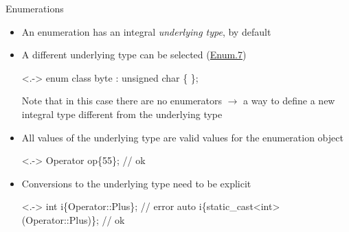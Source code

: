 \begin{frame}[fragile]{Enumerations \insertcontinuationtext}

  \begin{itemize}[<+->]
  \item An enumeration has an integral \textit{underlying type}, by default 
  \item A different underlying type can be selected (\href{https://isocpp.github.io/CppCoreGuidelines/CppCoreGuidelines#enum7-specify-the-underlying-type-of-an-enumeration-only-when-necessary}{Enum.7})
    \begin{codeblock}<.->{
enum class byte : unsigned char \{ \};}\end{codeblock}

    Note that in this case there are no enumerators $\rightarrow$ a way to define a
    new integral type different from the underlying type

  \item All values of the underlying type are valid values for the enumeration
    object

    \begin{codeblock}<.->
Operator op\{55\};  // ok\end{codeblock}

  \item Conversions to the underlying type need to be explicit

    \begin{codeblock}<.->
int i\{Operator::Plus\};                     // error
auto i\{static_cast<int>(Operator::Plus)\};  // ok\end{codeblock}

  \end{itemize}

\end{frame}

